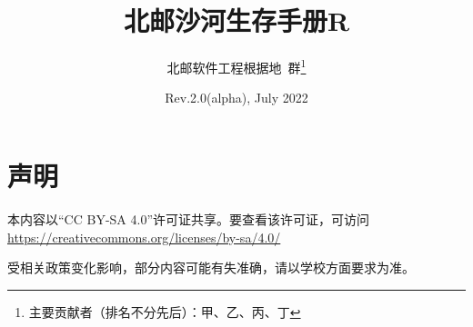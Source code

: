 \documentclass[UTF8]{ctexart}
\title{\textbf{北邮沙河生存手册R}}
\author{北邮软件工程根据地\ 群\thanks{主要贡献者（排名不分先后）：甲、乙、丙、丁}}
\date{Rev.2.0(alpha), July 2022}
\begin{document}
\maketitle
\section*{声明}
\begin{center}
    本内容以“CC BY-SA 4.0”许可证共享。要查看该许可证，可访问\\
    \href{https://creativecommons.org/licenses/by-sa/4.0/}{https://creativecommons.org/licenses/by-sa/4.0/}

    受相关政策变化影响，部分内容可能有失准确，请以学校方面要求为准。
\end{center}
\tableofcontents
\newpage


















\end{document}
